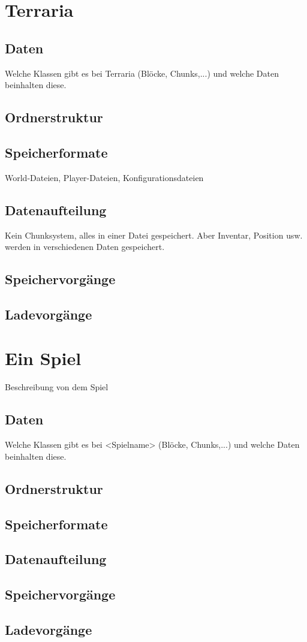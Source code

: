 \section{Terraria}
\subsection{Daten}
Welche Klassen gibt es bei Terraria (Blöcke, Chunks,...) und welche Daten 
beinhalten diese.

\subsection{Ordnerstruktur}

\subsection{Speicherformate}
World-Dateien, Player-Dateien, Konfigurationsdateien 

\subsection{Datenaufteilung}
Kein Chunksystem, alles in einer Datei gespeichert. Aber Inventar, Position
usw. werden in verschiedenen Daten gespeichert.

\subsection{Speichervorgänge}

\subsection{Ladevorgänge}


\section{Ein Spiel}
Beschreibung von dem Spiel

\subsection{Daten}
Welche Klassen gibt es bei <Spielname> (Blöcke, Chunks,...) und welche Daten 
beinhalten diese.

\subsection{Ordnerstruktur}

\subsection{Speicherformate}

\subsection{Datenaufteilung}

\subsection{Speichervorgänge}

\subsection{Ladevorgänge}
